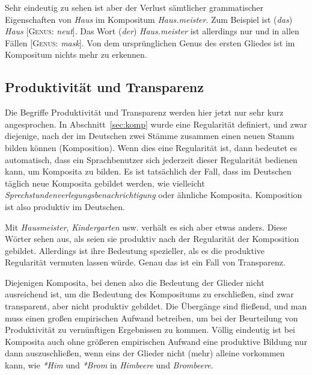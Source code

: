 Sehr eindeutig zu sehen ist aber der Verlust sämtlicher grammatischer Eigenschaften von \textit{Haus} im Kompositum \textit{Haus.meister}.
Zum Beispiel ist (\textit{das}) \textit{Haus} [\textsc{Genus}: \textit{neut}].
Das Wort (\textit{der}) \textit{Haus.meister} ist allerdings nur und in allen Fällen [\textsc{Genus}: \textit{mask}].
Von dem ursprünglichen Genus des ersten Gliedes ist im Kompositum nichts mehr zu erkennen.

\subsection{Produktivität und Transparenz}

\label{sec:produktivitaettransparenz}

Die Begriffe Produktivität und Transparenz werden hier jetzt nur sehr kurz angesprochen.
In Abschnitt~\ref{sec:komp} wurde eine Regularität definiert, und zwar diejenige, nach der im Deutschen zwei Stämme zusammen einen neuen Stamm bilden können (Komposition).
Wenn dies eine Regularität ist, dann bedeutet es automatisch, dass ein Sprachbenutzer sich jederzeit dieser Regularität bedienen kann, um Komposita zu bilden.
Es ist tatsächlich der Fall, dass im Deutschen täglich neue Komposita gebildet werden, wie vielleicht \textit{Sprechstundenverlegungsbenachrichtigung} oder ähnliche Komposita.
Komposition ist also produktiv im Deutschen.


Mit \textit{Hausmeister}, \textit{Kindergarten} usw. verhält es sich aber etwas anders.
Diese Wörter sehen aus, als seien sie produktiv nach der Regularität der Komposition gebildet.
Allerdings ist ihre Bedeutung spezieller, als es die produktive Regularität vermuten lassen würde.
Genau das ist ein Fall von Transparenz.


Diejenigen Komposita, bei denen also die Bedeutung der Glieder nicht ausreichend ist, um die Bedeutung des Kompositums zu erschließen, sind zwar transparent, aber nicht produktiv gebildet.
Die Übergänge sind fließend, und man muss einen großen empirischen Aufwand betreiben, um bei der Beurteilung von Produktivität zu vernünftigen Ergebnissen zu kommen.
Völlig eindeutig ist bei Komposita auch ohne größeren empirischen Aufwand eine produktive Bildung nur dann auszuschließen, wenn eins der Glieder nicht (mehr) alleine vorkommen kann, wie \textit{*Him} und \textit{*Brom} in \textit{Himbeere} und \textit{Brombeere}.

